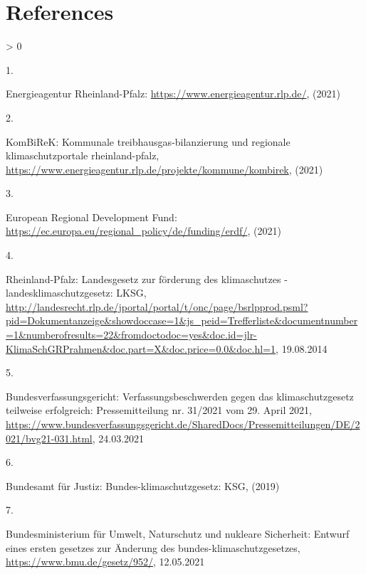 \documentclass[a4paper,11pt]{article}
\newlength{\cslhangindent}
\newlength{\csllabelwidth}
\newenvironment{CSLReferences}[3] %
 {%
  \setlength{\parindent}{0pt}
  \ifodd #1 \everypar{\setlength{\hangindent}{\cslhangindent}}\ignorespaces\fi
  \ifnum #2 > 0
  \setlength{\parskip}{#2\baselineskip}
  \fi
 }%
 {}
\newcommand{\CSLLeftMargin}[1]{\parbox[t]{\maxof{\widthof{#1}}{\csllabelwidth}}{#1}}
\newcommand{\CSLRightInline}[1]{\parbox[t]{\linewidth}{#1}}
\begin{document}
\hypertarget{references}{%
\section*{References}\label{references}}

\noindent

\setlength{\parindent}{-0.5cm}
\setlength{\leftskip}{0.5cm}
\setlength{\parskip}{8pt}

\hypertarget{refs}{}
\begin{CSLReferences}{0}{0}
\leavevmode\hypertarget{ref-EnergieagenturRheinlandPfalz.2021}{}%
\CSLLeftMargin{1. }
\CSLRightInline{Energieagentur Rheinland-Pfalz: \url{https://www.energieagentur.rlp.de/}, (2021)}

\leavevmode\hypertarget{ref-KomBiReK.2021}{}%
\CSLLeftMargin{2. }
\CSLRightInline{KomBiReK: Kommunale treibhausgas-bilanzierung und regionale klimaschutzportale rheinland-pfalz, \url{https://www.energieagentur.rlp.de/projekte/kommune/kombirek}, (2021)}

\leavevmode\hypertarget{ref-EuropeanRegionalDevelopmentFund.2021}{}%
\CSLLeftMargin{3. }
\CSLRightInline{European Regional Development Fund: \url{https://ec.europa.eu/regional_policy/de/funding/erdf/}, (2021)}

\leavevmode\hypertarget{ref-RheinlandPfalz.19.08.2014}{}%
\CSLLeftMargin{4. }
\CSLRightInline{Rheinland-Pfalz: Landesgesetz zur f{ö}rderung des klimaschutzes - landesklimaschutzgesetz: LKSG, \url{http://landesrecht.rlp.de/jportal/portal/t/onc/page/bsrlpprod.psml?pid=Dokumentanzeige\&showdoccase=1\&js_peid=Trefferliste\&documentnumber=1\&numberofresults=22\&fromdoctodoc=yes\&doc.id=jlr-KlimaSchGRPrahmen\&doc.part=X\&doc.price=0.0\&doc.hl=1}, 19.08.2014}

\leavevmode\hypertarget{ref-Bundesverfassungsgericht.24.03.2021}{}%
\CSLLeftMargin{5. }
\CSLRightInline{Bundesverfassungsgericht: Verfassungsbeschwerden gegen das klimaschutzgesetz teilweise erfolgreich: Pressemitteilung nr. 31/2021 vom 29. April 2021, \url{https://www.bundesverfassungsgericht.de/SharedDocs/Pressemitteilungen/DE/2021/bvg21-031.html}, 24.03.2021}

\leavevmode\hypertarget{ref-BundesamtfurJustiz.2019}{}%
\CSLLeftMargin{6. }
\CSLRightInline{Bundesamt für Justiz: Bundes-klimaschutzgesetz: KSG, (2019)}

\leavevmode\hypertarget{ref-BundesministeriumfurUmweltNaturschutzundnukleareSicherheit.12.05.2021}{}%
\CSLLeftMargin{7. }
\CSLRightInline{Bundesministerium für Umwelt, Naturschutz und nukleare Sicherheit: Entwurf eines ersten gesetzes zur {Ä}nderung des bundes-klimaschutzgesetzes, \url{https://www.bmu.de/gesetz/952/}, 12.05.2021}


\end{CSLReferences}
\end{document}

